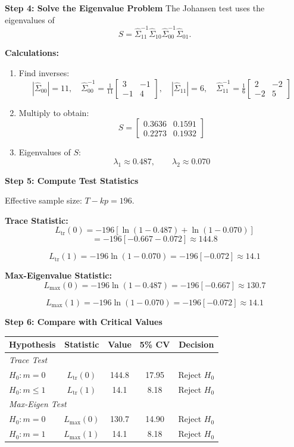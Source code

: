 \begin{frame}[allowframebreaks]
	\framebreak
	\textbf{Step 4: Solve the Eigenvalue Problem}
	The Johansen test uses the eigenvalues of
	\[
	S = \hat{\Sigma}_{11}^{-1}\hat{\Sigma}_{10}\hat{\Sigma}_{00}^{-1}\hat{\Sigma}_{01}.
	\]
	
	\framebreak
	\textbf{Calculations:}
	\begin{enumerate}
		\item Find inverses:
		\[
		|\hat{\Sigma}_{00}| = 11, \quad 
		\hat{\Sigma}_{00}^{-1} = \tfrac{1}{11}
		\begin{bmatrix}
			3 & -1\\
			-1 & 4
		\end{bmatrix}, \quad
		|\hat{\Sigma}_{11}| = 6, \quad
		\hat{\Sigma}_{11}^{-1} = \tfrac{1}{6}
		\begin{bmatrix}
			2 & -2\\
			-2 & 5
		\end{bmatrix}
		\]
		\item Multiply to obtain:
		\[
		S =
		\begin{bmatrix}
			0.3636 & 0.1591\\
			0.2273 & 0.1932
		\end{bmatrix}
		\]
		\item Eigenvalues of \(S\):
		\[
		\lambda_1 \approx 0.487, \qquad \lambda_2 \approx 0.070
		\]
	\end{enumerate}
	
	\framebreak
	\textbf{Step 5: Compute Test Statistics}
	
	Effective sample size: \(T - kp = 196\).
	
	\textbf{Trace Statistic:}
	$$L_{\mathrm{tr}}(0) = -196 \left[\ln(1 - 0.487) + \ln(1 - 0.070)\right]$$
	$$= -196[-0.667 - 0.072] \approx \mathbf{144.8}$$
	
	$$L_{\mathrm{tr}}(1) = -196 \ln(1 - 0.070)
	= -196[-0.072] \approx \mathbf{14.1}$$
	
	\textbf{Max-Eigenvalue Statistic:}
	$$L_{\max}(0) = -196 \ln(1 - 0.487)
		= -196[-0.667] \approx \mathbf{130.7}$$
		
	$$L_{\max}(1) = -196 \ln(1 - 0.070)
	= -196[-0.072] \approx \mathbf{14.1}$$
	
	\framebreak
	\textbf{Step 6: Compare with Critical Values}
	\centering
	\renewcommand{\arraystretch}{1.2}
	\begin{tabular}{lcccc}
		\hline
		\textbf{Hypothesis} & \textbf{Statistic} & \textbf{Value} & \textbf{5\% CV} & \textbf{Decision}\\
		\hline
		\multicolumn{5}{l}{\textit{Trace Test}}\\
		$H_0: m=0$ & $L_{\mathrm{tr}}(0)$ & 144.8 & 17.95 & Reject $H_0$\\
		$H_0: m \le 1$ & $L_{\mathrm{tr}}(1)$ & 14.1 & 8.18 & Reject $H_0$\\[2mm]
		\multicolumn{5}{l}{\textit{Max-Eigen Test}}\\
		$H_0: m=0$ & $L_{\max}(0)$ & 130.7 & 14.90 & Reject $H_0$\\
		$H_0: m=1$ & $L_{\max}(1)$ & 14.1 & 8.18 & Reject $H_0$\\
		\hline
	\end{tabular}
	

\end{frame}
